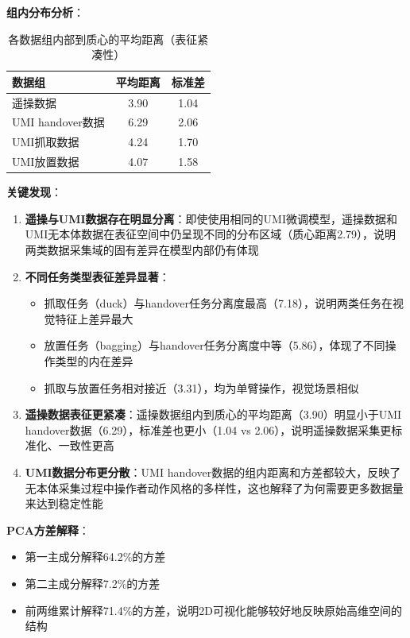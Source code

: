 \textbf{组内分布分析}：
\begin{table}[htbp]
\centering
\caption{各数据组内部到质心的平均距离（表征紧凑性）}
\label{tab:vlm_compactness}
\begin{tabular}{lcc}
\toprule
数据组 & 平均距离 & 标准差 \\
\midrule
遥操数据 & 3.90 & 1.04 \\
UMI handover数据 & 6.29 & 2.06 \\
UMI抓取数据 & 4.24 & 1.70 \\
UMI放置数据 & 4.07 & 1.58 \\
\bottomrule
\end{tabular}
\end{table}

\textbf{关键发现}：
\begin{enumerate}[leftmargin=2em]
    \item \textbf{遥操与UMI数据存在明显分离}：即使使用相同的UMI微调模型，遥操数据和UMI无本体数据在表征空间中仍呈现不同的分布区域（质心距离2.79），说明两类数据采集域的固有差异在模型内部仍有体现
    
    \item \textbf{不同任务类型表征差异显著}：
    \begin{itemize}
        \item 抓取任务（duck）与handover任务分离度最高（7.18），说明两类任务在视觉特征上差异最大
        \item 放置任务（bagging）与handover任务分离度中等（5.86），体现了不同操作类型的内在差异
        \item 抓取与放置任务相对接近（3.31），均为单臂操作，视觉场景相似
    \end{itemize}
    
    \item \textbf{遥操数据表征更紧凑}：遥操数据组内到质心的平均距离（3.90）明显小于UMI handover数据（6.29），标准差也更小（1.04 vs 2.06），说明遥操数据采集更标准化、一致性更高
    
    \item \textbf{UMI数据分布更分散}：UMI handover数据的组内距离和方差都较大，反映了无本体采集过程中操作者动作风格的多样性，这也解释了为何需要更多数据量来达到稳定性能
\end{enumerate}

\textbf{PCA方差解释}：
\begin{itemize}[leftmargin=2em]
    \item 第一主成分解释64.2\%的方差
    \item 第二主成分解释7.2\%的方差
    \item 前两维累计解释71.4\%的方差，说明2D可视化能够较好地反映原始高维空间的结构
\end{itemize}

